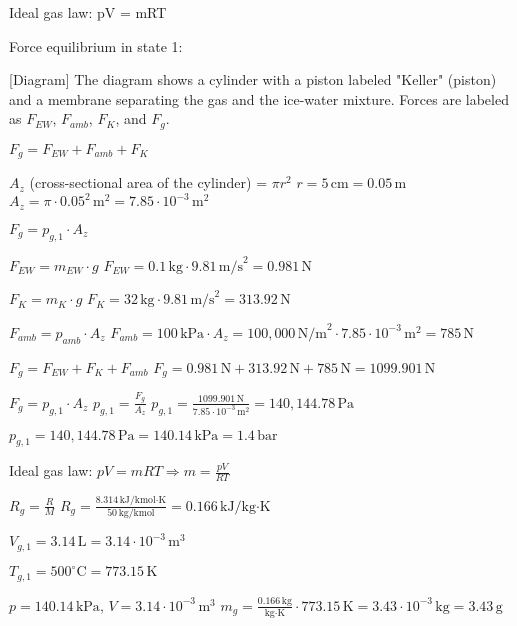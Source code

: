 Ideal gas law: pV = mRT  

Force equilibrium in state 1:  

[Diagram]  
The diagram shows a cylinder with a piston labeled "Keller" (piston) and a membrane separating the gas and the ice-water mixture. Forces are labeled as \( F_{EW} \), \( F_{amb} \), \( F_K \), and \( F_g \).  

\( F_g = F_{EW} + F_{amb} + F_K \)  

\( A_z \) (cross-sectional area of the cylinder) = \( \pi r^2 \)  
\( r = 5 \, \text{cm} = 0.05 \, \text{m} \)  
\( A_z = \pi \cdot 0.05^2 \, \text{m}^2 = 7.85 \cdot 10^{-3} \, \text{m}^2 \)  

\( F_g = p_{g,1} \cdot A_z \)  

\( F_{EW} = m_{EW} \cdot g \)  
\( F_{EW} = 0.1 \, \text{kg} \cdot 9.81 \, \text{m/s}^2 = 0.981 \, \text{N} \)  

\( F_K = m_K \cdot g \)  
\( F_K = 32 \, \text{kg} \cdot 9.81 \, \text{m/s}^2 = 313.92 \, \text{N} \)  

\( F_{amb} = p_{amb} \cdot A_z \)  
\( F_{amb} = 100 \, \text{kPa} \cdot A_z = 100,000 \, \text{N/m}^2 \cdot 7.85 \cdot 10^{-3} \, \text{m}^2 = 785 \, \text{N} \)  

\( F_g = F_{EW} + F_K + F_{amb} \)  
\( F_g = 0.981 \, \text{N} + 313.92 \, \text{N} + 785 \, \text{N} = 1099.901 \, \text{N} \)  

\( F_g = p_{g,1} \cdot A_z \)  
\( p_{g,1} = \frac{F_g}{A_z} \)  
\( p_{g,1} = \frac{1099.901 \, \text{N}}{7.85 \cdot 10^{-3} \, \text{m}^2} = 140,144.78 \, \text{Pa} \)  

\( p_{g,1} = 140,144.78 \, \text{Pa} = 140.14 \, \text{kPa} = 1.4 \, \text{bar} \)  

Ideal gas law:  
\( pV = mRT \Rightarrow m = \frac{pV}{RT} \)  

\( R_g = \frac{R}{M} \)  
\( R_g = \frac{8.314 \, \text{kJ/kmol·K}}{50 \, \text{kg/kmol}} = 0.166 \, \text{kJ/kg·K} \)  

\( V_{g,1} = 3.14 \, \text{L} = 3.14 \cdot 10^{-3} \, \text{m}^3 \)  

\( T_{g,1} = 500^\circ \text{C} = 773.15 \, \text{K} \)

\( p = 140.14 \, \text{kPa}, \, V = 3.14 \cdot 10^{-3} \, \text{m}^3 \)  
\( m_g = \frac{0.166 \, \text{kg}}{\text{kg} \cdot \text{K}} \cdot 773.15 \, \text{K} = 3.43 \cdot 10^{-3} \, \text{kg} = 3.43 \, \text{g} \)
